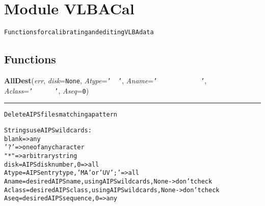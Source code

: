 %
%
%


\section{Module VLBACal}

    \label{VLBACal}
\begin{alltt}
Functions for calibrating and editing VLBA data\end{alltt}



  \subsection{Functions}

    \label{VLBACal:AllDest}
    \vspace{0.5ex}

    \begin{boxedminipage}{\textwidth}

    \raggedright \textbf{AllDest}(\textit{err}, \textit{disk}=\texttt{N\-o\-n\-e\-}, \textit{Atype}=\texttt{'\-~\-~\-'\-}, \textit{Aname}=\texttt{'\-~\-~\-~\-~\-~\-~\-~\-~\-~\-~\-~\-~\-'\-}, \textit{Aclass}=\texttt{'\-~\-~\-~\-~\-~\-~\-'\-}, \textit{Aseq}=\texttt{0\-})

    \vspace{-1.5ex}

    \rule{\textwidth}{0.5\fboxrule}
\begin{alltt}
Delete AIPS files matching a pattern

Strings use AIPS wild cards:
    blank ={\textgreater} any
    '?'   ={\textgreater} one of any character
    "*"   ={\textgreater} arbitrary string
disk      = AIPS disk number, 0={\textgreater}all
Atype     = AIPS entry type, 'MA' or 'UV'; '  ={\textgreater} all
Aname     = desired AIPS name, using AIPS wildcards, None -{\textgreater} don't check
Aclass    = desired AIPS class, using AIPS wildcards, None -{\textgreater} don't check
Aseq      = desired AIPS sequence, 0={\textgreater} any\end{alltt}

    \vspace{1ex}

    \end{boxedminipage}

